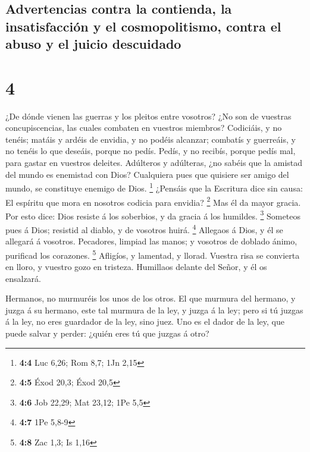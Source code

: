 \hypertarget{advertencias-contra-la-contienda-la-insatisfacciuxf3n-y-el-cosmopolitismo-contra-el-abuso-y-el-juicio-descuidado}{%
\subsection{Advertencias contra la contienda, la insatisfacción y el
cosmopolitismo, contra el abuso y el juicio
descuidado}\label{advertencias-contra-la-contienda-la-insatisfacciuxf3n-y-el-cosmopolitismo-contra-el-abuso-y-el-juicio-descuidado}}

\hypertarget{section-3}{%
\section{4}\label{section-3}}

 ¿De dónde vienen las guerras y los pleitos entre vosotros?
¿No son de vuestras concupiscencias, las cuales combaten en vuestros
miembros?  Codiciáis, y no tenéis; matáis y ardéis de
envidia, y no podéis alcanzar; combatís y guerreáis, y no tenéis lo que
deseáis, porque no pedís.  Pedís, y no recibís, porque pedís
mal, para gastar en vuestros deleites.  Adúlteros y
adúlteras, ¿no sabéis que la amistad del mundo es enemistad con Dios?
Cualquiera pues que quisiere ser amigo del mundo, se constituye enemigo
de Dios. \footnote{\textbf{4:4} Luc 6,26; Rom 8,7; 1Jn 2,15}
 ¿Pensáis que la Escritura dice sin causa: El espíritu que
mora en nosotros codicia para envidia? \footnote{\textbf{4:5} Éxod 20,3;
  Éxod 20,5}  Mas él da mayor gracia. Por esto dice: Dios
resiste á los soberbios, y da gracia á los humildes. \footnote{\textbf{4:6}
  Job 22,29; Mat 23,12; 1Pe 5,5}  Someteos pues á Dios;
resistid al diablo, y de vosotros huirá. \footnote{\textbf{4:7} 1Pe
  5,8-9}  Allegaos á Dios, y él se allegará á vosotros.
Pecadores, limpiad las manos; y vosotros de doblado ánimo, purificad los
corazones. \footnote{\textbf{4:8} Zac 1,3; Is 1,16} 
Afligíos, y lamentad, y llorad. Vuestra risa se convierta en lloro, y
vuestro gozo en tristeza.  Humillaos delante del Señor, y
él os ensalzará.

 Hermanos, no murmuréis los unos de los otros. El que
murmura del hermano, y juzga á su hermano, este tal murmura de la ley, y
juzga á la ley; pero si tú juzgas á la ley, no eres guardador de la ley,
sino juez.  Uno es el dador de la ley, que puede salvar y
perder: ¿quién eres tú que juzgas á otro?

